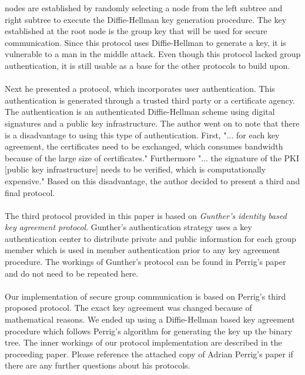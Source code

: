 \documentclass[12pt]{article}
\begin{document}
	nodes are established by randomly selecting a node from the left 
	subtree and right subtree to execute the Diffie-Hellman key generation 
	procedure.  The key established at the root node is the group key that
	will be used for secure communication.  Since this protocol uses 
	Diffie-Hellman to generate a key, it is vulnerable to a man in the 
	middle attack.  Even though this protocol lacked group authentication, 
	it is still usable as a base for the other protocols to build upon.\\
        \\
	Next he presented a protocol, which incorporates user authentication.
	This authentication is generated through a trusted third party or a 
	certificate agency. The authentication is an authenticated 
	Diffie-Hellman scheme using digital signatures and a public key 
	infrastructure. The author went on to note that there is a 
	disadvantage to using this type of authentication. First, "... for each
	key agreement, the certificates need to be exchanged, which consumes
	bandwidth because of the large size of certificates." Furthermore 
	"... the signature of the PKI [public key infrastructure] needs to be 
	verified, which is computationally expensive." Based on this 
	disadvantage, the author decided to present a third and final 
	protocol.\\
	\\
	The third protocol provided in this paper is based on \textit{Gunther's
	identity based key agreement protocol}.  Gunther's authentication 
	strategy uses a key authentication center to distribute private and
	public information for each group member which is used in member
	authentication prior to any key agreement procedure.  
	The workings of Gunther's protocol can be found in Perrig's paper 
	and do not need to be repeated here.\\
	\\
	Our implementation of secure group communication is based on Perrig's 
	third proposed protocol.  The exact key agreement was changed because 
	of mathematical reasons.  We ended up using a Diffie-Hellman based 
	key agreement procedure which follows Perrig's algorithm for 
	generating the key up the binary tree. The inner workings of our 
	protocol implementation are described in the proceeding paper. Please 
	reference the attached copy of Adrian Perrig's paper if there are any 
	further questions about his protocols.
	\\
	
\end{document}
